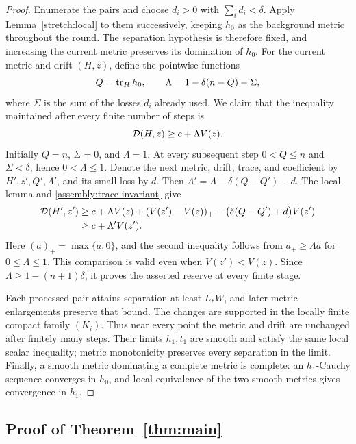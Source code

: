 \begin{proof}
Enumerate the pairs and choose $d_i>0$ with $\sum_i d_i<\delta$.
Apply Lemma~\ref{stretch:local} to them successively, keeping $h_0$
as the background metric throughout the round.  The separation
hypothesis is therefore fixed, and increasing the current metric
preserves its domination of $h_0$.  For the current metric and drift
$(H,z)$, define the pointwise functions
\[
 Q=\operatorname{tr}_H h_0,\qquad
 \Lambda=1-\delta(n-Q)-\Sigma,
\]
where $\Sigma$ is the sum of the losses $d_i$ already used.  We claim
that the inequality maintained after every finite number of steps is
\begin{equation}\label{assembly:trace-invariant}
 \mathcal D(H,z)\ge c+\Lambda V(z).
\end{equation}
Initially $Q=n$, $\Sigma=0$, and $\Lambda=1$.  At every subsequent
step $0<Q\le n$ and $\Sigma<\delta$, hence
$0<\Lambda\le1$.  Denote the next metric, drift, trace, and coefficient
by $H',z',Q',\Lambda'$, and its small loss by $d$.  Then
$\Lambda'=\Lambda-\delta(Q-Q')-d$.  The local lemma and
\eqref{assembly:trace-invariant} give
\begin{align*}
 \mathcal D(H',z')
 &\ge c+\Lambda V(z)+(V(z')-V(z))_+
                 -\bigl(\delta(Q-Q')+d\bigr)V(z')\\
 &\ge c+\Lambda'V(z').
\end{align*}
Here $(a)_+=\max\{a,0\}$, and the second inequality follows from
$a_+\ge\Lambda a$ for $0\le\Lambda\le1$.  This comparison is valid
even when $V(z')<V(z)$.  Since
$\Lambda\ge1-(n+1)\delta$, it proves the asserted reserve at every
finite stage.

Each processed pair attains separation at least $L_*W$, and later
metric enlargements preserve that bound.  The changes are supported
in the locally finite compact family $(K_i)$.  Thus near every point
the metric and drift are unchanged after finitely many steps.  Their
limits $h_1,t_1$ are smooth and satisfy the same local scalar inequality;
metric monotonicity preserves every separation in the limit.
Finally, a smooth metric dominating a complete metric is complete:
an $h_1$-Cauchy sequence converges in $h_0$, and local equivalence of
the two smooth metrics gives convergence in $h_1$.
\end{proof}

\subsection{Proof of Theorem~\ref{thm:main}}

